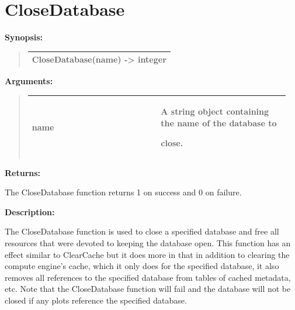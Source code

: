 \documentclass[letterpaper,10pt,english]{sphinxmanual}
\begin{document}
\section{CloseDatabase}
\label{functions:closedatabase}
\begin{DUlineblock}{0em}
\item[] \textbf{Synopsis:}
\end{DUlineblock}
\begin{quote}

\begin{tabulary}{\linewidth}{|L|}
\hline

CloseDatabase(name) -\textgreater{} integer
\\
\hline\end{tabulary}

\end{quote}

\begin{DUlineblock}{0em}
\item[] 
\item[] \textbf{Arguments:}
\end{DUlineblock}
\begin{quote}

\begin{tabular}{|p{0.475\linewidth}|p{0.475\linewidth}|}
\hline

name
 & 
\begin{DUlineblock}{0em}
\item[] A string object containing the name of the database to
\item[] close.
\end{DUlineblock}
\\
\hline\end{tabular}

\end{quote}

\begin{DUlineblock}{0em}
\item[] 
\item[] \textbf{Returns:}
\item[] The CloseDatabase function returns 1 on success and 0 on failure.
\item[] 
\item[] \textbf{Description:}
\item[] The CloseDatabase function is used to close a specified database and free
all resources that were devoted to keeping the database open. This function
has an effect similar to ClearCache but it does more in that
in addition to clearing the compute engine's cache, which it only does for
the specified database, it also removes all references to the specified
database from tables of cached metadata, etc. Note that the CloseDatabase
function will fail and the database will not be closed if any plots
reference the specified database.
\end{DUlineblock}
\end{document}
